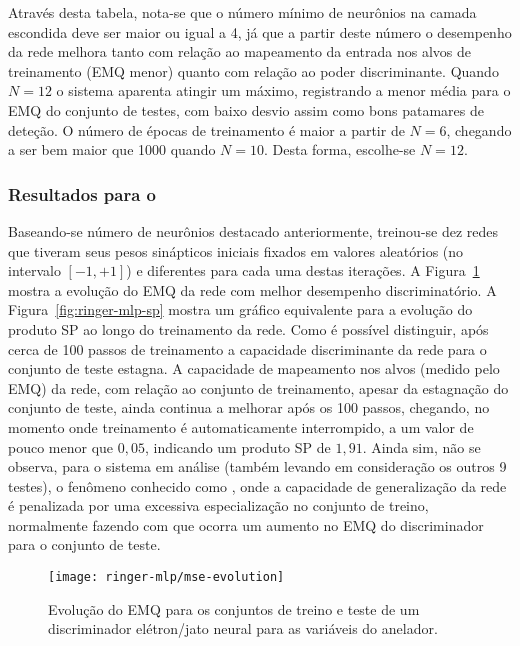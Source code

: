 Através desta tabela, nota-se que o número mínimo de neurônios na camada
escondida deve ser maior ou igual a 4, já que a partir deste número o
desempenho da rede melhora tanto com relação ao mapeamento da entrada nos
alvos de treinamento (EMQ menor) quanto com relação ao poder
discriminante. Quando $N=12$ o sistema aparenta atingir um máximo, registrando
a menor média para o EMQ do conjunto de testes, com baixo desvio assim como
bons patamares de deteção. O número de épocas de treinamento é maior a partir
de $N=6$, chegando a ser bem maior que 1000 quando $N=10$. Desta forma,
escolhe-se $N=12$.

\subsubsection{Resultados para o }

Baseando-se número de neurônios destacado anteriormente, treinou-se dez redes
que tiveram seus pesos sinápticos iniciais fixados em valores aleatórios (no
intervalo $[-1,+1]$) e diferentes para cada uma destas iterações. A
Figura~\ref{fig:ringer-mlp-mse} mostra a evolução do EMQ da rede com melhor
desempenho discriminatório. A Figura~\ref{fig:ringer-mlp-sp} mostra um gráfico
equivalente para a evolução do produto SP ao longo do treinamento da
rede. Como é possível distinguir, após cerca de 100 passos de treinamento a
capacidade discriminante da rede para o conjunto de teste estagna. A
capacidade de mapeamento nos alvos (medido pelo EMQ) da rede, com relação ao
conjunto de treinamento, apesar da estagnação do conjunto de teste, ainda
continua a melhorar após os 100 passos, chegando, no momento onde treinamento
é automaticamente interrompido, a um valor de pouco menor que $0,05$,
indicando um produto SP de $1,91$. Ainda sim, não se observa, para o sistema
em análise (também levando em consideração os outros 9 testes), o fenômeno
conhecido como , onde a capacidade de generalização da rede
é penalizada por uma excessiva especialização no conjunto de treino,
normalmente fazendo com que ocorra um aumento no EMQ do discriminador para o
conjunto de teste.

\begin{figure}
\begin{center}
\texttt{[image: ringer-mlp/mse-evolution]}
\end{center}
\caption{Evolução do EMQ para os conjuntos de treino e teste de um
discriminador elétron/jato neural para as variáveis do anelador.}
\label{fig:ringer-mlp-mse}
\end{figure}

